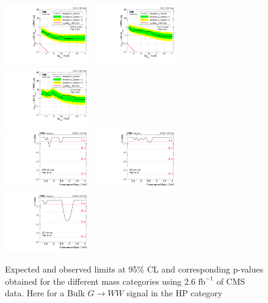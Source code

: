 \begin{figure}[h!]
\centering
\includegraphics[width=0.327\textwidth]{figures/analysis/search1/AN-15-211/limits/brazilianFlag_BulkWW_WWHP_13TeV_wPDF.pdf}
\includegraphics[width=0.327\textwidth]{figures/analysis/search1/AN-15-211/limits/brazilianFlag_BulkWW_WZHP_13TeV_wPDF.pdf}
\includegraphics[width=0.327\textwidth]{figures/analysis/search1/AN-15-211/limits/brazilianFlag_BulkWW_ZZHP_13TeV_wPDF.pdf}\\
\includegraphics[width=0.327\textwidth]{figures/analysis/search1/AN-15-211/pvalues/pvalue_BulkWWinWW_high_purity.pdf}
\includegraphics[width=0.327\textwidth]{figures/analysis/search1/AN-15-211/pvalues/pvalue_BulkWWinWZ_high_purity.pdf}
\includegraphics[width=0.327\textwidth]{figures/analysis/search1/AN-15-211/pvalues/pvalue_BulkWWinZZ_high_purity.pdf}
\caption{Expected and observed limits at 95\% CL and corresponding p-values obtained for the different mass categories using 2.6 $\textrm{fb}^{-1}$ of CMS data. Here for a Bulk $G\rightarrow WW$ signal in the HP category}
\label{fig:app:Limits_HPBulkWW}
\end{figure}
